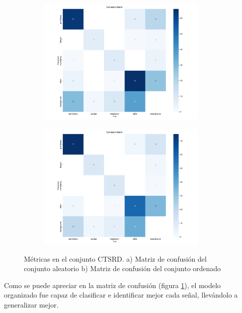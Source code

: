 \documentclass{article}
\begin{document}
\begin{figure}[h]
\begin{subfigure}[b]{0.5\textwidth}
\centering
\includegraphics[width=0.9\textwidth]{resources/random cuban confusion matrix.png}
\caption{}
\end{subfigure}
\begin{subfigure}[b]{0.5\textwidth}
\centering
\includegraphics[width=0.9\textwidth]{resources/sim cuban confusion matrix.png}
\caption{}
\end{subfigure}
\caption{Métricas en el conjunto CTSRD. a) Matriz de confusión del conjunto aleatorio b) Matriz de confusión del conjunto ordenado}
\label{fig:confusion random vs confusion sim}
\end{figure}

Como se puede apreciar en la matriz de confusión (figura \ref{fig:confusion random vs confusion sim}), el modelo organizado fue capaz de clasificar e identificar mejor cada señal, llevándolo a generalizar mejor.
\end{document}
